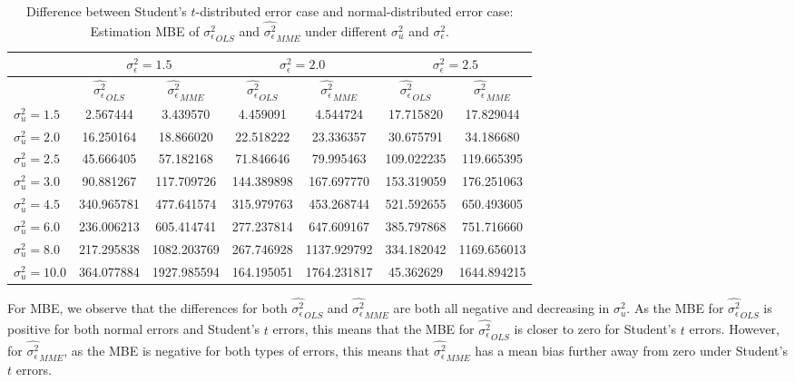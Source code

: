 \documentclass{article}
\begin{document}
\begin{table}[ht]
    \centering
    \caption{Difference between Student's $t$-distributed error case and normal-distributed error case: Estimation MBE of $\hat{\sigma^2_\epsilon}_{OLS}$ and $\hat{\sigma^2_\epsilon}_{MME}$ under different $\sigma^2_u$ and $\sigma^2_\epsilon$.}
    \label{Tab:MSE_sigma_diff_t}
    \begin{tabular}[t]{lcccccc}
        \hline
        &\multicolumn{2}{c}{$\sigma^2_\epsilon=1.5$}&\multicolumn{2}{c}{$\sigma^2_\epsilon=2.0$}&\multicolumn{2}{c}{$\sigma^2_\epsilon=2.5$}\\
        \hline
        &$\hat{\sigma^2_\epsilon}_{OLS}$&$\hat{\sigma^2_\epsilon}_{MME}$&$\hat{\sigma^2_\epsilon}_{OLS}$&
        $\hat{\sigma^2_\epsilon}_{MME}$&$\hat{\sigma^2_\epsilon}_{OLS}$&$\hat{\sigma^2_\epsilon}_{MME}$\\
        \hline
        $\sigma^2_u = 1.5$&2.567444&3.439570&4.459091&4.544724&17.715820&17.829044\\
        $\sigma^2_u = 2.0$&16.250164&18.866020&22.518222&23.336357&30.675791&34.186680\\
        $\sigma^2_u = 2.5$&45.666405&57.182168&71.846646&79.995463&109.022235&119.665395\\
        $\sigma^2_u = 3.0$&90.881267&117.709726&144.389898&167.697770&153.319059&176.251063\\
        $\sigma^2_u = 4.5$&340.965781&477.641574&315.979763&453.268744&521.592655&650.493605\\
        $\sigma^2_u = 6.0$&236.006213&605.414741&277.237814&647.609167&385.797868&751.716660\\
        $\sigma^2_u = 8.0$&217.295838&1082.203769&267.746928&1137.929792&334.182042&1169.656013\\
        $\sigma^2_u = 10.0$&364.077884&1927.985594&164.195051&1764.231817&45.362629&1644.894215\\
        \hline
    \end{tabular}
\end{table}

For MBE, we observe that the differences for both $\hat{\sigma^2_\epsilon}_{OLS}$ and $\hat{\sigma^2_\epsilon}_{MME}$ are both all negative and decreasing in $\sigma^2_u$.
As the MBE for $\hat{\sigma^2_\epsilon}_{OLS}$ is positive for both normal errors and Student's $t$ errors, this means that the MBE for $\hat{\sigma^2_\epsilon}_{OLS}$ is closer to zero for Student's $t$ errors.
However, for $\hat{\sigma^2_\epsilon}_{MME}$, as the MBE is negative for both types of errors, this means that $\hat{\sigma^2_\epsilon}_{MME}$ has a mean bias further away from zero under Student's $t$ errors.
\end{document}
